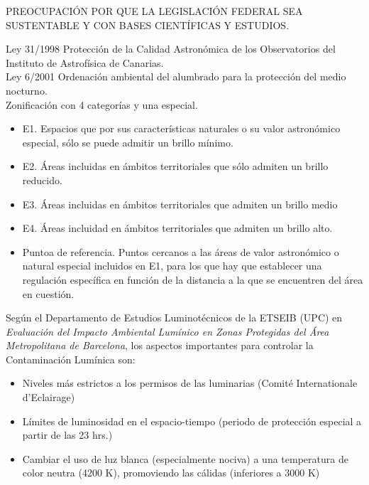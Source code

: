 PREOCUPACIÓN POR QUE LA LEGISLACIÓN FEDERAL SEA SUSTENTABLE Y CON BASES CIENTÍFICAS Y ESTUDIOS.

Ley 31/1998 Protección de la Calidad Astronómica de los Observatorios del Instituto de Astrofísica de Canarias.\\

Ley 6/2001 Ordenación ambiental del alumbrado para la protección del medio nocturno.\\

Zonificación con 4 categorías y una especial.\\

\begin{itemize}

    \item E1. Espacios que por sus características naturales o su valor astronómico especial, sólo se puede admitir un brillo mínimo.
    
    \item E2. Áreas incluidas en ámbitos territoriales que sólo admiten un brillo reducido.
    
    \item E3. Áreas incluidas en ámbitos territoriales que admiten un brillo medio
    
    \item E4. Áreas incluidad en ámbitos territoriales que admiten un brillo alto.
    
    \item Puntoa de referencia. Puntos cercanos a las áreas de valor astronómico o natural especial incluidos en E1, para los que hay que establecer una regulación específica en función de la distancia a la que se encuentren del área en cuestión.
    
    
\end{itemize}

Según el Departamento de Estudios Luminotécnicos de la ETSEIB (UPC) en \textit{Evaluación del Impacto Ambiental Lumínico en Zonas Protegidas del Área Metropolitana de Barcelona}, los aspectos importantes para controlar la Contaminación Lumínica son:

\begin{itemize}
    \item Niveles más estrictos a los permisos de las luminarias (Comité Internationale d'Eclairage)
    
    \item Límites de luminosidad en el espacio-tiempo (periodo de protección especial a partir de las 23 hrs.)
    
     \item Cambiar el uso de luz blanca (especialmente nociva) a una temperatura de color neutra (4200 K), promoviendo las cálidas (inferiores a 3000 K)
     
\end{itemize}


